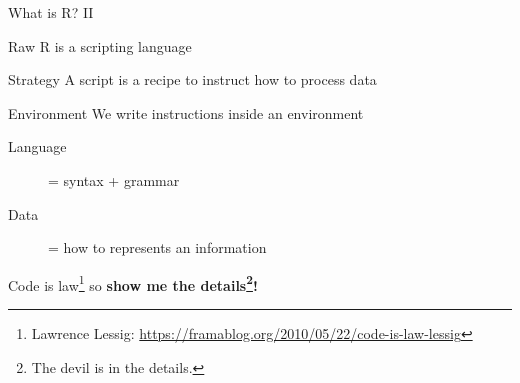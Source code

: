 \documentclass[10pt, xcolor=table]{beamer}
\begin{document}
\begin{frame}{What is R? II}

  \begin{alertblock}{Raw}
    \centering
    R is a scripting language
  \end{alertblock}
  \begin{exampleblock}{Strategy}
    \centering
    A script is a recipe to instruct how to process data
  \end{exampleblock}
  \begin{block}{Environment}
    \centering
    We write instructions inside an environment
  \end{block}

  \bigskip

  \begin{description}
  \item[Language] = syntax + grammar
  \item[Data] = how to represents an information
  \end{description}

  \begin{center}
    Code is law\footnote{Lawrence Lessig:
      \url{https://framablog.org/2010/05/22/code-is-law-lessig}}
    so \textbf{show me the details\footnote{The devil is in the details.}!}
  \end{center}

\end{frame}

\end{document}
